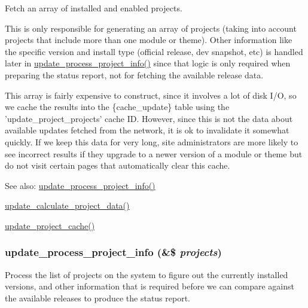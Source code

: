 Fetch an array of installed and enabled projects.

This is only responsible for generating an array of projects (taking into account projects that include more than one module or theme). Other information like the specific version and install type (official release, dev snapshot, etc) is handled later in \hyperlink{update_8compare_8inc_d14173209d3e9cf76fbd6d6d1977de05}{update\_\-process\_\-project\_\-info()} since that logic is only required when preparing the status report, not for fetching the available release data.

This array is fairly expensive to construct, since it involves a lot of disk I/O, so we cache the results into the \{cache\_\-update\} table using the 'update\_\-project\_\-projects' cache ID. However, since this is not the data about available updates fetched from the network, it is ok to invalidate it somewhat quickly. If we keep this data for very long, site administrators are more likely to see incorrect results if they upgrade to a newer version of a module or theme but do not visit certain pages that automatically clear this cache.

\begin{Desc}
\item[See also:]\hyperlink{update_8compare_8inc_d14173209d3e9cf76fbd6d6d1977de05}{update\_\-process\_\-project\_\-info()} 

\hyperlink{update_8compare_8inc_a0663304dc4634e4109c896f214ea791}{update\_\-calculate\_\-project\_\-data()} 

\hyperlink{update_8compare_8inc_958705ecce49b020722280decff3f644}{update\_\-project\_\-cache()} \end{Desc}
\hypertarget{update_8compare_8inc_d14173209d3e9cf76fbd6d6d1977de05}{
\subsubsection[{update\_\-process\_\-project\_\-info}]{\setlength{\rightskip}{0pt plus 5cm}update\_\-process\_\-project\_\-info (\&\$ {\em projects})}}
\label{update_8compare_8inc_d14173209d3e9cf76fbd6d6d1977de05}


Process the list of projects on the system to figure out the currently installed versions, and other information that is required before we can compare against the available releases to produce the status report.

